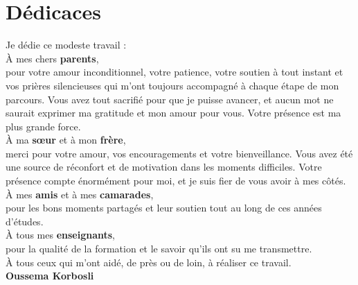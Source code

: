 \chapter*{Dédicaces}

\begin{center}\itshape
\vspace*{0.6cm}

Je dédie ce modeste travail :\\[0.7cm]

À mes chers \textbf{parents},\\
pour votre amour inconditionnel, votre patience, votre soutien à tout instant et
vos prières silencieuses qui m'ont toujours accompagné à chaque étape de mon
parcours. Vous avez tout sacrifié pour que je puisse avancer, et aucun mot ne
saurait exprimer ma gratitude et mon amour pour vous. Votre présence est ma plus
grande force.\\[0.55cm]

À ma \textbf{sœur} et à mon \textbf{frère},\\
merci pour votre amour, vos encouragements et votre bienveillance. Vous avez été
une source de réconfort et de motivation dans les moments difficiles. Votre
présence compte énormément pour moi, et je suis fier de vous avoir à mes côtés.\\[0.55cm]

À mes \textbf{amis} et à mes \textbf{camarades},\\
pour les bons moments partagés et leur soutien tout au long de ces années
d'études.\\[0.55cm]

À tous mes \textbf{enseignants},\\
pour la qualité de la formation et le savoir qu'ils ont su me transmettre.\\[0.7cm]

À tous ceux qui m'ont aidé, de près ou de loin, à réaliser ce travail.\\[0.8cm]

\normalfont\bfseries Oussema Korbosli
\end{center}
\clearpage
